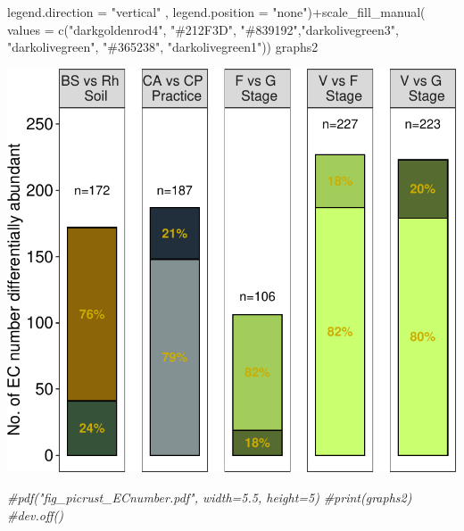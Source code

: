 \documentclass[]{interact}
\theoremstyle{plain}%
\theoremstyle{definition}
\theoremstyle{remark}
\newenvironment{Shaded}{\begin{snugshade}}{\end{snugshade}}
\newcommand{\AttributeTok}[1]{\textcolor[rgb]{0.77,0.63,0.00}{#1}}
\newcommand{\CommentTok}[1]{\textcolor[rgb]{0.56,0.35,0.01}{\textit{#1}}}
\newcommand{\FunctionTok}[1]{\textcolor[rgb]{0.00,0.00,0.00}{#1}}
\newcommand{\NormalTok}[1]{#1}
\newcommand{\SpecialCharTok}[1]{\textcolor[rgb]{0.00,0.00,0.00}{#1}}
\newcommand{\StringTok}[1]{\textcolor[rgb]{0.31,0.60,0.02}{#1}}
\begin{document}
\begin{Shaded}
\begin{Highlighting}[]
        \AttributeTok{legend.direction =} \StringTok{"vertical"}\NormalTok{ ,}
        \AttributeTok{legend.position =} \StringTok{"none"}\NormalTok{)}\SpecialCharTok{+}\FunctionTok{scale\_fill\_manual}\NormalTok{(}
          \AttributeTok{values =} \FunctionTok{c}\NormalTok{(}\StringTok{"darkgoldenrod4"}\NormalTok{,}
                     \StringTok{"\#212F3D"}\NormalTok{, }\StringTok{"\#839192"}\NormalTok{,}\StringTok{"darkolivegreen3"}\NormalTok{,}
                     \StringTok{"darkolivegreen"}\NormalTok{,}
                     \StringTok{"\#365238"}\NormalTok{, }\StringTok{"darkolivegreen1"}\NormalTok{))}
\NormalTok{   graphs2}
\end{Highlighting}
\end{Shaded}

\begin{center}\includegraphics{Doc_pdf_files/figure-latex/unnamed-chunk-49-1} \end{center}

\begin{Shaded}
\begin{Highlighting}[]
\CommentTok{\#pdf("fig\_picrust\_ECnumber.pdf", width=5.5, height=5)}
\CommentTok{\#print(graphs2)}
\CommentTok{\#dev.off()}
\end{Highlighting}
\end{Shaded}




\end{document}
